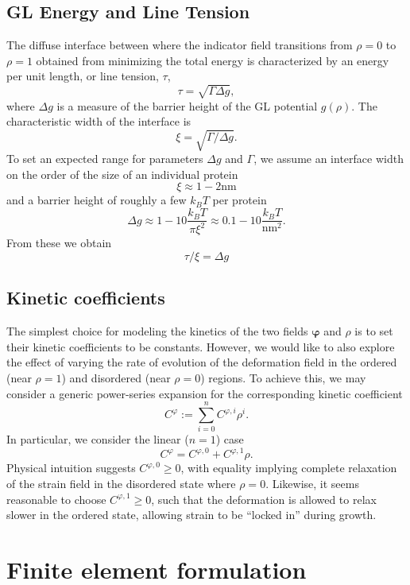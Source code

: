 \documentclass[
pre,
 twocolumn,
amsmath,
amssymb
]{revtex4}
\begin{document}
\subsection{GL Energy and Line Tension} 
The diffuse interface between where the indicator field transitions from $\rho=0$ to $\rho=1$ obtained from minimizing the total energy is characterized by an energy per unit length, or line tension, $\tau$,
\[
\tau = \sqrt{ \Gamma \Delta g} ,
\]
where $\Delta g$ is a measure of the barrier height of the GL potential $g(\rho)$.  The characteristic width of the interface is
\[
\xi = \sqrt{\Gamma / \Delta g} . 
\]
To set an expected range for parameters $\Delta g$ and $\Gamma$, we assume an interface width on the order of the size of an individual protein
\[
\xi \approx 1-2 \text{nm}
\]
and a barrier height of roughly a few $k_BT$ per protein
\[
\Delta g \approx 1-10 \frac{k_BT}{\pi \xi^2} \approx 0.1-10\frac{k_B T}{\text{nm}^2} .
\]
From these we obtain
\[
\tau/\xi = \Delta g
\]
\subsection{Kinetic coefficients}\label{sec:kinetics} %
The simplest choice for modeling the kinetics of the two fields $\bm{\varphi}$ and $\rho$ is to set their kinetic coefficients to be constants.  However, we would like to also explore the effect of varying the rate of evolution of the deformation field in the ordered (near $\rho=1$) and disordered (near $\rho=0$) regions.  To achieve this, we may consider a generic power-series expansion for the corresponding kinetic coefficient
\[
C^\varphi:=\sum_{i=0}^n C^{\varphi,i}\rho^i .
\]
In particular, we consider the linear ($n=1$) case
\[
C^\varphi = C^{\varphi,0} + C^{\varphi,1} \rho .
\]
Physical intuition suggests $C^{\varphi,0}\ge 0$, with equality implying complete relaxation of the strain field in the disordered state where $\rho=0$.  Likewise, it seems reasonable to choose $C^{\varphi,1}\ge 0$, such that the deformation is allowed to relax slower in the ordered state, allowing strain to be ``locked in'' during growth.

\section{\label{sec:FEM}Finite element formulation}
\end{document}
